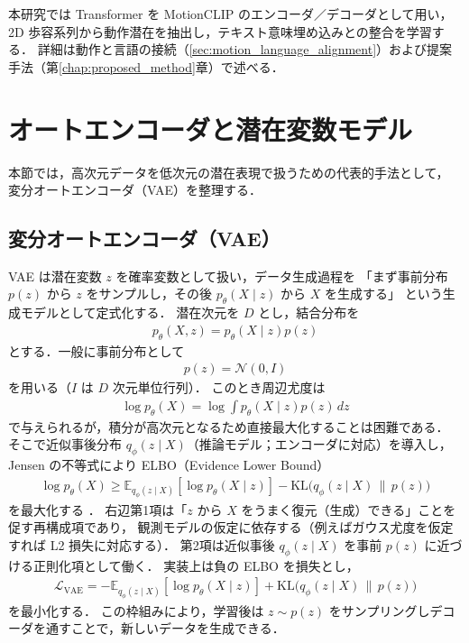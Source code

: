 本研究では Transformer を MotionCLIP のエンコーダ／デコーダとして用い，
2D 歩容系列から動作潜在を抽出し，テキスト意味埋め込みとの整合を学習する．
詳細は動作と言語の接続（\ref{sec:motion_language_alignment}）および提案手法（第\ref{chap:proposed_method}章）で述べる．


\section{オートエンコーダと潜在変数モデル}
\label{sec:latent_models}

本節では，高次元データを低次元の潜在表現で扱うための代表的手法として，
変分オートエンコーダ（VAE）を整理する．

\subsection{変分オートエンコーダ（VAE）}
\label{subsec:VAE}

VAE は潜在変数 $z$ を確率変数として扱い，データ生成過程を
「まず事前分布 $p(z)$ から $z$ をサンプルし，その後 $p_\theta(X\mid z)$ から $X$ を生成する」
という生成モデルとして定式化する．
潜在次元を $D$ とし，結合分布を
\begin{align}
  p_\theta(X,z)=p_\theta(X\mid z)p(z)
\end{align}
とする．一般に事前分布として
\begin{align}
  p(z)=\mathcal{N}(0,I)
\end{align}
を用いる（$I$ は $D$ 次元単位行列）．
このとき周辺尤度は
\begin{align}
  \log p_\theta(X) = \log\int p_\theta(X\mid z)p(z)\,dz
\end{align}
で与えられるが，積分が高次元となるため直接最大化することは困難である．
そこで近似事後分布 $q_\phi(z\mid X)$（推論モデル；エンコーダに対応）を導入し，
Jensen の不等式により ELBO（Evidence Lower Bound）
\begin{align}
  \log p_\theta(X)
  \ge
  \mathbb{E}_{q_\phi(z\mid X)}[\log p_\theta(X\mid z)]
  -\mathrm{KL}\bigl(q_\phi(z\mid X)\,\|\,p(z)\bigr)
  \label{eq:elbo}
\end{align}
を最大化する \cite{VAE}．
右辺第1項は「$z$ から $X$ をうまく復元（生成）できる」ことを促す再構成項であり，
観測モデルの仮定に依存する（例えばガウス尤度を仮定すれば L2 損失に対応する）．
第2項は近似事後 $q_\phi(z\mid X)$ を事前 $p(z)$ に近づける正則化項として働く．
実装上は負の ELBO を損失とし，
\begin{align}
  \mathcal{L}_{\mathrm{VAE}}=
  -\mathbb{E}_{q_\phi(z\mid X)}[\log p_\theta(X\mid z)]
  +\mathrm{KL}\bigl(q_\phi(z\mid X)\,\|\,p(z)\bigr)
\end{align}
を最小化する．
この枠組みにより，学習後は $z\sim p(z)$ をサンプリングしデコーダを通すことで，新しいデータを生成できる．

